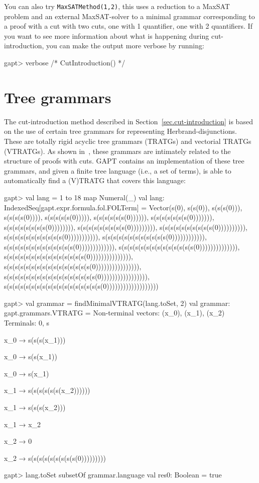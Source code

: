\documentclass[a4paper,11pt]{book}
\begin{document}
You can also try \texttt{MaxSATMethod(1,2)}, this uses a reduction to a MaxSAT
problem and an external MaxSAT-solver to a
minimal grammar corresponding to a proof with a cut with two cuts, one with 1
quantifier, one with 2 quantifiers.  If you want to see more information
about what is happening during cut-introduction, you can make the output more
verbose by running:

\begin{clilisting}
gapt> verbose { /* CutIntroduction() */ }

\end{clilisting}

\section{Tree grammars}

The cut-introduction method described in Section~\ref{sec.cut-introduction} is
based on the use of certain tree grammars for representing Herbrand-disjunctions.
These are totally rigid acyclic tree grammars (TRATGs) and vectorial TRATGs (VTRATGs).
As shown in~\cite{Hetzl14Algorithmic}, these grammars are intimately related to
the structure of proofs with cuts.  GAPT contains an implementation of
these tree grammars, and given a finite tree language (i.e., a set of terms), is
able to automatically find a (V)TRATG that covers this language:

\begin{clilisting}
gapt> val lang = 1 to 18 map { Numeral(_) }
  val lang: IndexedSeq[gapt.expr.formula.fol.FOLTerm] = Vector(s(0), s(s(0)), s(s(s(0))), s(s(s(s(0)))), s(s(s(s(s(0))))), s(s(s(s(s(s(0)))))), s(s(s(s(s(s(s(0))))))), s(s(s(s(s(s(s(s(0)))))))), s(s(s(s(s(s(s(s(s(0))))))))), s(s(s(s(s(s(s(s(s(s(0)))))))))), s(s(s(s(s(s(s(s(s(s(s(0))))))))))), s(s(s(s(s(s(s(s(s(s(s(s(0)))))))))))), s(s(s(s(s(s(s(s(s(s(s(s(s(0))))))))))))), s(s(s(s(s(s(s(s(s(s(s(s(s(s(0)))))))))))))), s(s(s(s(s(s(s(s(s(s(s(s(s(s(s(0))))))))))))))), s(s(s(s(s(s(s(s(s(s(s(s(s(s(s(s(0)))))))))))))))), s(s(s(s(s(s(s(s(s(s(s(s(s(s(s(s(s(0))))))))))))))))), s(s(s(s(s(s(s(s(s(s(s(s(s(s(s(s(s(s(0)))))))))))))))))))

gapt> val grammar = findMinimalVTRATG(lang.toSet, 2)
  val grammar: gapt.grammars.VTRATG =
  Non-terminal vectors: (x_0), (x_1), (x_2)
  Terminals: 0, s

  x_0 → s(s(s(x_1)))

  x_0 → s(s(x_1))

  x_0 → s(x_1)

  x_1 → s(s(s(s(s(s(x_2))))))

  x_1 → s(s(s(x_2)))

  x_1 → x_2

  x_2 → 0

  x_2 → s(s(s(s(s(s(s(s(s(0)))))))))

gapt> lang.toSet subsetOf grammar.language
  val res0: Boolean = true

\end{clilisting}
\end{document}

